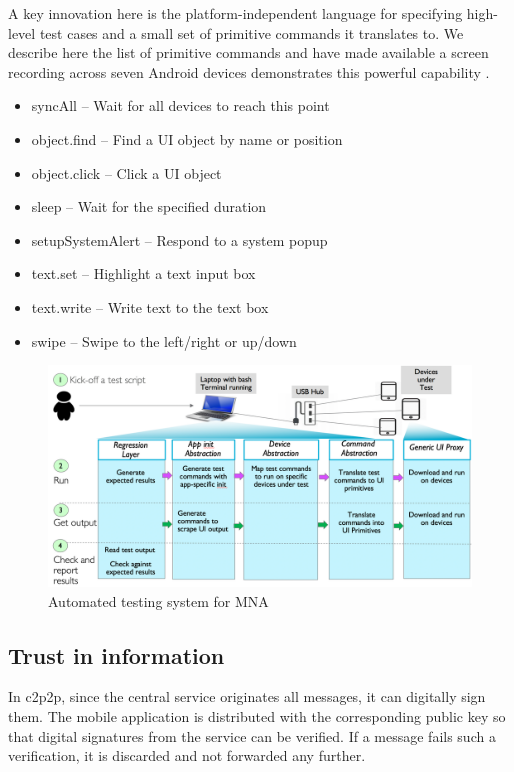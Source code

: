 \documentclass[conference]{IEEEtran}
\begin{document}
A key innovation here is the platform-independent language for
specifying high-level test cases and a small set of primitive commands
it translates to. We describe here the list of primitive commands and
have made available a screen recording across seven Android devices
demonstrates this powerful capability \cite{mna-test-demo}.
\begin{itemize}
\item \textsf{syncAll} -- Wait for all devices to reach this point
\item \textsf{object.find} -- Find a UI object by name or position
\item \textsf{object.click} -- Click a UI object
\item \textsf{sleep} -- Wait for the specified duration
\item \textsf{setupSystemAlert} -- Respond to a system popup
\item \textsf{text.set} -- Highlight a text input box
\item \textsf{text.write} -- Write text to the text box
\item \textsf{swipe} -- Swipe to the left/right or up/down
\end{itemize}

\begin{figure}[htbp]
\centerline{\includegraphics[width=\columnwidth]{figs/test_arch}}
\caption{Automated testing system for MNA}
\label{fig:test_arch}
\end{figure}

%
\subsection{Trust in information}
\label{sec:trust}
%
In c2p2p, since the central service originates all messages, it can
digitally sign them. The mobile application is distributed
with the corresponding public key so that digital signatures from the
service can be verified.  If a message fails such a verification, it
is discarded and not forwarded any further.
\end{document}
